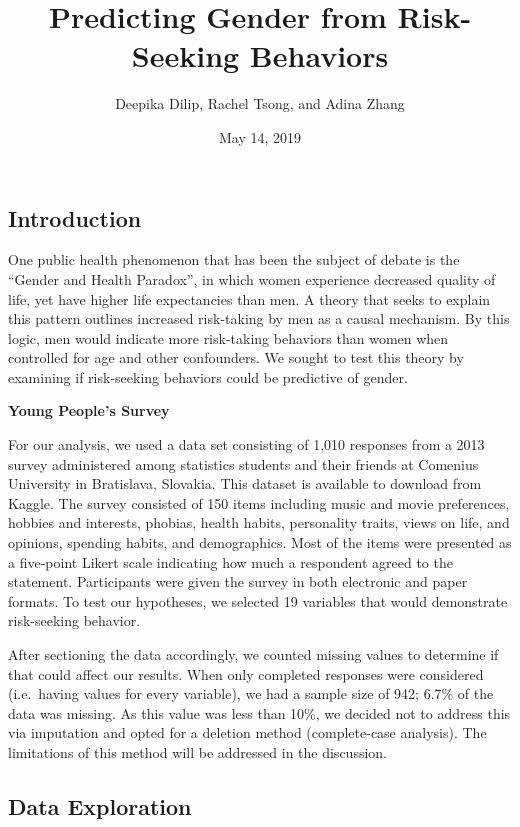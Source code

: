 \documentclass[]{article}
\title{Predicting Gender from Risk-Seeking Behaviors}
\author{Deepika Dilip, Rachel Tsong, and Adina Zhang}
\date{May 14, 2019}
\begin{document}
\maketitle

\subsection{Introduction}\label{introduction}

One public health phenomenon that has been the subject of debate is the
``Gender and Health Paradox'', in which women experience decreased
quality of life, yet have higher life expectancies than men. A theory
that seeks to explain this pattern outlines increased risk-taking by men
as a causal mechanism. By this logic, men would indicate more
risk-taking behaviors than women when controlled for age and other
confounders. We sought to test this theory by examining if risk-seeking
behaviors could be predictive of gender.

\textbf{Young People's Survey}

For our analysis, we used a data set consisting of 1,010 responses from
a 2013 survey administered among statistics students and their friends
at Comenius University in Bratislava, Slovakia. This dataset is
available to download from Kaggle. The survey consisted of 150 items
including music and movie preferences, hobbies and interests, phobias,
health habits, personality traits, views on life, and opinions, spending
habits, and demographics. Most of the items were presented as a
five-point Likert scale indicating how much a respondent agreed to the
statement. Participants were given the survey in both electronic and
paper formats. To test our hypotheses, we selected 19 variables that
would demonstrate risk-seeking behavior.

After sectioning the data accordingly, we counted missing values to
determine if that could affect our results. When only completed
responses were considered (i.e.~having values for every variable), we
had a sample size of 942; 6.7\% of the data was missing. As this value
was less than 10\%, we decided not to address this via imputation and
opted for a deletion method (complete-case analysis). The limitations of
this method will be addressed in the discussion.

\subsection{Data Exploration}\label{data-exploration}
\end{document}
